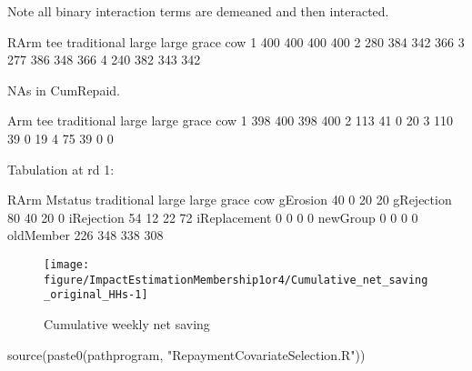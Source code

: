 Note all binary interaction terms are demeaned and then interacted.
\begin{Schunk}
\begin{Soutput}
   RArm
tee traditional large large grace cow
  1         400   400         400 400
  2         280   384         342 366
  3         277   386         348 366
  4         240   382         343 342
\end{Soutput}
\end{Schunk}
NAs in \textsf{CumRepaid}.
\begin{Schunk}
\begin{Soutput}
   Arm
tee traditional large large grace cow
  1         398   400         398 400
  2         113    41           0  20
  3         110    39           0  19
  4          75    39           0   0
\end{Soutput}
\end{Schunk}
Tabulation at rd 1:
\begin{Schunk}
\begin{Soutput}
              RArm
Mstatus        traditional large large grace cow
  gErosion              40     0          20  20
  gRejection            80    40          20   0
  iRejection            54    12          22  72
  iReplacement           0     0           0   0
  newGroup               0     0           0   0
  oldMember            226   348         338 308
\end{Soutput}
\end{Schunk}
\begin{Schunk}
\begin{figure}

{\centering \texttt{[image: figure/ImpactEstimationMembership1or4/Cumulative\_net\_saving\_original\_HHs-1]} 

}

\caption[Cumulative weekly net saving]{Cumulative weekly net saving}\label{Figure Cumulative net saving original HHs}
\end{figure}
\end{Schunk}


\begin{Schunk}
\begin{Sinput}
source(paste0(pathprogram, "RepaymentCovariateSelection.R"))
\end{Sinput}
\end{Schunk}







